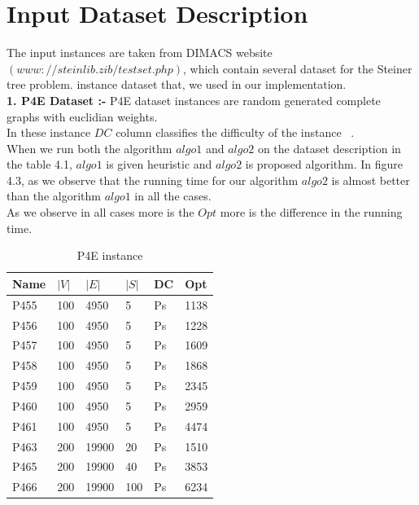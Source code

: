 \section{Input Dataset Description}

The input instances are taken from DIMACS website $(www://steinlib.zib/testset.php)$, which contain several dataset for the Steiner tree problem.
instance dataset that, we used in our implementation.\\

\textbf{1. P4E Dataset :-} P4E dataset instances are random generated complete graphs with euclidian weights.\\
In these instance $DC$ column classifies the difficulty of the instance ~\cite{koch}.\\
When we run both the algorithm $algo1$  and $algo2$ on the dataset description in the table 4.1, $algo1$ is given heuristic and $algo2$ is proposed algorithm.
In figure 4.3, as we observe that the running time for our algorithm $algo2$ is almost better than the algorithm $algo1$ in all the cases.\\
As we observe in all cases more is the $Opt$ more is the difference in the running time.\\ 

\begin{table}[ht]
\label{my-label}
\begin{center}
\begin{tabular}{|l|l|l|l|l|l|}
\hline
Name & $|V|$      & $|E|$      & $|S|$      & DC         & Opt       \\ \hline
P455    &  100       &  4950      &    5   &  Ps         &  1138  \\ \hline
P456    &  100       &  4950      &    5   &  Ps         &  1228  \\ \hline
P457    &  100       &  4950      &    5   &  Ps         &  1609  \\ \hline
P458    &  100       &  4950      &    5   &  Ps         &  1868  \\ \hline
P459    &  100       &  4950      &    5   &  Ps         &  2345  \\ \hline
P460    &  100       &  4950      &    5   &  Ps         &  2959  \\ \hline
P461    &  100       &  4950      &    5   &  Ps         &  4474  \\ \hline
P463    &  200       &  19900     &    20  &  Ps         &  1510  \\ \hline
P465    &  200       &  19900     &    40  &  Ps         &  3853  \\ \hline
P466    &  200       &  19900     &    100 &  Ps         &  6234  \\ \hline
\end{tabular}
\end{center}
\caption{P4E instance}
\end{table}


